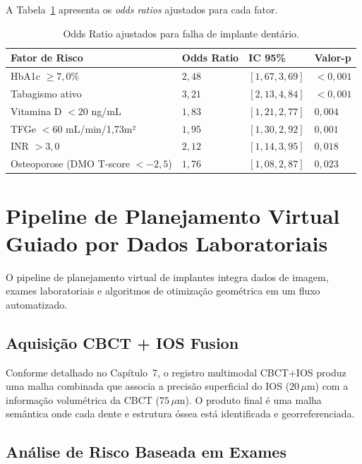 A Tabela~\ref{tab:odds-ratio-implantes} apresenta os \textit{odds ratios} ajustados para cada fator.

\begin{longtable}{p{4cm}p{2.5cm}p{2.5cm}p{2.5cm}}
\caption{Odds Ratio ajustados para falha de implante dentário.}
\label{tab:odds-ratio-implantes}\\
\toprule
\textbf{Fator de Risco} & \textbf{Odds Ratio} & \textbf{IC 95\%} & \textbf{Valor-p} \\
\midrule
HbA1c $\geq 7,0\%$ & $2,48$ & $[1,67, 3,69]$ & $<0,001$ \\
Tabagismo ativo & $3,21$ & $[2,13, 4,84]$ & $<0,001$ \\
Vitamina D $<20$ ng/mL & $1,83$ & $[1,21, 2,77]$ & $0,004$ \\
TFGe $<60$ mL/min/1,73m² & $1,95$ & $[1,30, 2,92]$ & $0,001$ \\
INR $>3,0$ & $2,12$ & $[1,14, 3,95]$ & $0,018$ \\
Osteoporose (DMO T-score $<-2,5$) & $1,76$ & $[1,08, 2,87]$ & $0,023$ \\
\bottomrule
\end{longtable}

\section{Pipeline de Planejamento Virtual Guiado por Dados Laboratoriais}
\label{sec:pipeline-planejamento}

O pipeline de planejamento virtual de implantes integra dados de imagem, exames laboratoriais e algoritmos de otimização geométrica em um fluxo automatizado.

\subsection{Aquisição CBCT + IOS Fusion}
\label{subsec:cbct-ios-fusion}

Conforme detalhado no Capítulo~7, o registro multimodal CBCT+IOS produz uma malha combinada que associa a precisão superficial do IOS ($20\,\mu$m) com a informação volumétrica da CBCT ($75\,\mu$m). O produto final é uma malha semântica onde cada dente e estrutura óssea está identificada e georreferenciada.

\subsection{Análise de Risco Baseada em Exames}
\label{subsec:analise-risco-exames}

